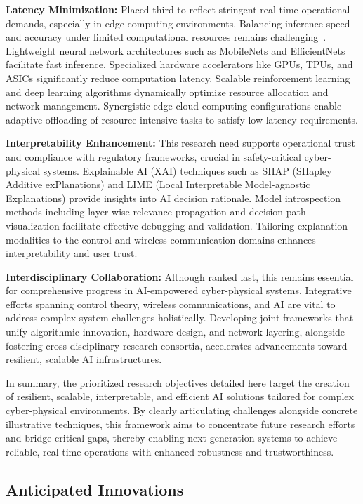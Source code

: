 \documentclass[sigconf]{acmart}
\begin{document}
\textbf{Latency Minimization:} Placed third to reflect stringent real-time operational demands, especially in edge computing environments. Balancing inference speed and accuracy under limited computational resources remains challenging~\cite{ref50}. Lightweight neural network architectures such as MobileNets and EfficientNets facilitate fast inference. Specialized hardware accelerators like GPUs, TPUs, and ASICs significantly reduce computation latency. Scalable reinforcement learning and deep learning algorithms dynamically optimize resource allocation and network management. Synergistic edge-cloud computing configurations enable adaptive offloading of resource-intensive tasks to satisfy low-latency requirements.

\textbf{Interpretability Enhancement:} This research need supports operational trust and compliance with regulatory frameworks, crucial in safety-critical cyber-physical systems. Explainable AI (XAI) techniques such as SHAP (SHapley Additive exPlanations) and LIME (Local Interpretable Model-agnostic Explanations) provide insights into AI decision rationale. Model introspection methods including layer-wise relevance propagation and decision path visualization facilitate effective debugging and validation. Tailoring explanation modalities to the control and wireless communication domains enhances interpretability and user trust.

\textbf{Interdisciplinary Collaboration:} Although ranked last, this remains essential for comprehensive progress in AI-empowered cyber-physical systems. Integrative efforts spanning control theory, wireless communications, and AI are vital to address complex system challenges holistically. Developing joint frameworks that unify algorithmic innovation, hardware design, and network layering, alongside fostering cross-disciplinary research consortia, accelerates advancements toward resilient, scalable AI infrastructures.

In summary, the prioritized research objectives detailed here target the creation of resilient, scalable, interpretable, and efficient AI solutions tailored for complex cyber-physical environments. By clearly articulating challenges alongside concrete illustrative techniques, this framework aims to concentrate future research efforts and bridge critical gaps, thereby enabling next-generation systems to achieve reliable, real-time operations with enhanced robustness and trustworthiness.

\subsection{Anticipated Innovations}
\end{document}
